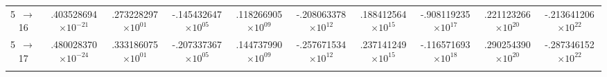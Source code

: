 \documentclass[reviewcopy]{elsarticle}
\begin{document}
\begin{landscape}
\begin{longtable}{lccccccccc}
 5~$\to$~ 16 &   .403528694$\times10^{-21}$ &  .273228297$\times10^{01}$ & -.145432647$\times10^{05}$ &  .118266905$\times10^{09}$ & -.208063378$\times10^{12}$ &  .188412564$\times10^{15}$ & -.908119235$\times10^{17}$ &  .221123266$\times10^{20}$ & -.213641206$\times10^{22}$ \\
 5~$\to$~ 17 &   .480028370$\times10^{-24}$ &  .333186075$\times10^{01}$ & -.207337367$\times10^{05}$ &  .144737990$\times10^{09}$ & -.257671534$\times10^{12}$ &  .237141249$\times10^{15}$ & -.116571693$\times10^{18}$ &  .290254390$\times10^{20}$ & -.287346152$\times10^{22}$ \\[3pt]
\hline \\
\end{longtable}
\normalsize
\renewcommand{\thefootnote}{\arabic{footnote}}
\renewcommand{\arraystretch}{1.0}
\end{landscape}

\newpage
\end{document}
